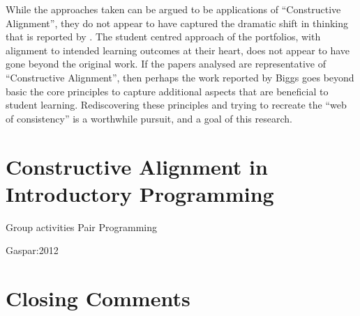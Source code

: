 While the approaches taken can be argued to be applications of ``Constructive Alignment'', they do not appear to have captured the dramatic shift in thinking that is reported by \citet{Biggs:1996c}. The student centred approach of the portfolios, with alignment to intended learning outcomes at their heart, does not appear to have gone beyond the original work. If the papers analysed are representative of ``Constructive Alignment'', then perhaps the work reported by Biggs goes beyond basic the core principles to capture additional aspects that are beneficial to student learning. Rediscovering these principles and trying to recreate the ``web of consistency'' is a worthwhile pursuit, and a goal of this research.








\clearpage
\section{Constructive Alignment in Introductory Programming} %
\label{sec:constructive_alignment_in_introductory_programming}

Group activities Pair Programming

Gaspar:2012


\section{Closing Comments} %
\label{sec:closing_comments}



